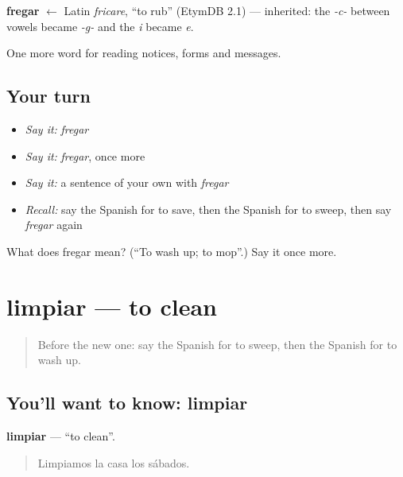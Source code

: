\begin{cousinweb}
\textbf{fregar} $\leftarrow$ Latin \emph{fricare}, \textquotedblleft{}to rub\textquotedblright{} (EtymDB 2.1) — inherited: the \emph{-c-} between vowels became \emph{-g-} and the \emph{i} became \emph{e}.
\end{cousinweb}

\begin{grammarlens}[title={What you've built}]
One more word for reading notices, forms and messages.
\end{grammarlens}

\subsection*{Your turn}
\begin{itemize}
\raggedright
  \item \emph{Say it:} \emph{fregar}
  \item \emph{Say it:} \emph{fregar}, once more
  \item \emph{Say it:} a sentence of your own with \emph{fregar}
  \item \emph{Recall:} say the Spanish for to save, then the Spanish for to sweep, then say \emph{fregar} again
\end{itemize}

\begin{tcolorbox}[breakable,colback=teal!4,colframe=teal!35!black,title={Before you move on}]
What does fregar mean? (\textquotedblleft{}To wash up; to mop\textquotedblright{}.) Say it once more.
\end{tcolorbox}
\section[limpiar]{limpiar — to clean}

\label{lesson:ES-C485-limpiar}



\begin{quote}
Before the new one: say the Spanish for to sweep, then the Spanish for to wash up.
\end{quote}

\subsection*{You'll want to know: limpiar}
\textbf{limpiar} — \textquotedblleft{}to clean\textquotedblright{}.

\begin{quote}
Limpiamos la casa los sábados.
\end{quote}

